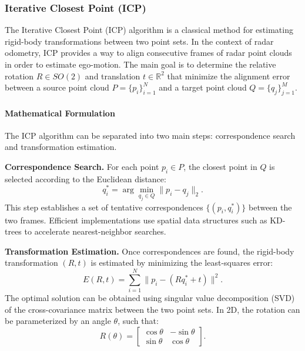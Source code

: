 \subsubsection{Iterative Closest Point (ICP)}
\label{subsec:icp}

The Iterative Closest Point (ICP) algorithm is a classical method for estimating rigid-body transformations between two point sets. 
In the context of radar odometry, ICP provides a way to align consecutive frames of radar point clouds in order to estimate ego-motion. 
The main goal is to determine the relative rotation $R \in SO(2)$ and translation $t \in \mathbb{R}^2$ that minimize the alignment error between a source point cloud $P = \{p_i\}_{i=1}^N$ and a target point cloud $Q = \{q_j\}_{j=1}^M$.

\paragraph{Mathematical Formulation}
The ICP algorithm can be separated into two main steps: correspondence search and transformation estimation.

\textbf{Correspondence Search.}
For each point $p_i \in P$, the closest point in $Q$ is selected according to the Euclidean distance:
\begin{equation}
    q^*_i = \arg \min_{q_j \in Q} \lVert p_i - q_j \rVert_2.
\end{equation}
This step establishes a set of tentative correspondences $\{(p_i, q^*_i)\}$ between the two frames. 
Efficient implementations use spatial data structures such as KD-trees to accelerate nearest-neighbor searches.

\textbf{Transformation Estimation.}
Once correspondences are found, the rigid-body transformation $(R,t)$ is estimated by minimizing the least-squares error:
\begin{equation}
    E(R,t) = \sum_{i=1}^{N} \lVert p_i - (R q^*_i + t) \rVert^2.
\end{equation}
The optimal solution can be obtained using singular value decomposition (SVD) of the cross-covariance matrix between the two point sets. 
In 2D, the rotation can be parameterized by an angle $\theta$, such that:
\begin{equation}
    R(\theta) = 
    \begin{bmatrix}
        \cos\theta & -\sin\theta \\
        \sin\theta & \cos\theta
    \end{bmatrix}.
\end{equation}


